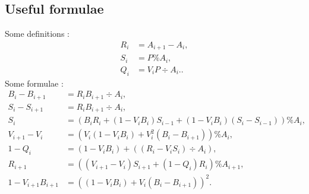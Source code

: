 \documentclass{sig-alternate-2013}
\begin{document}
\subsection{Useful formulae}

\begin{lem} \label{lem:formulae}
Some definitions :
\begin{align}
R_i &= A_{i+1} -A_i, \label{eqdef:Ri}\\
S_i &= P \% A_i, \label{eqdef:Si} \\
Q_i &= V_i P \div A_i. \label{eqdef:Qi}. 
\end{align}
Some formulae :
\begin{align}
B_i-B_{i+1} &= R_i B_{i+1} \div A_i, \label{eqdef:Biminus} \\
S_i-S_{i+1} &= R_i B_{i+1} \div A_i,  \label{eqdef:Siminus} \\
S_{i} &= (B_i R_i + (1-V_i B_i) S_{i-1}+(1-V_i B_i)(S_i-S_{i-1})) \% A_{i}, \label{eqdef:Si2}  \\
V_{i+1}-V_i &= (V_i (1-V_i B_i)+V_i^2(B_i-B_{i+1})) \% A_{i}, \label{eqdef:Viminus}\\
1-Q_i &= (1-V_i B_i)+((R_i-V_i S_i) \div A_i), \label{eqdef:Qiminus}\\
R_{i+1} &= ((V_{i+1}-V_i)S_{i+1}+(1-Q_i)R_i) \% A_{i+1}, \label{eq:Riplus}\\
1-V_{i+1}B_{i+1} &= ((1-V_i B_i)+V_i (B_i-B_{i+1}))^2. \label{eq:ViBiplus}
\end{align}
\end{lem}
\end{document}
